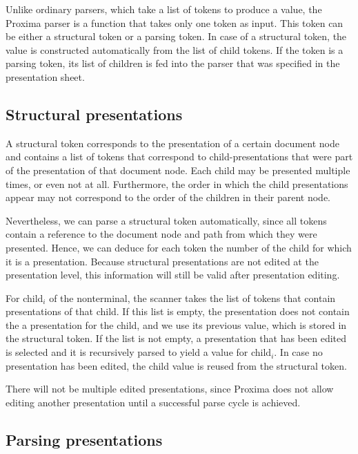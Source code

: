 \documentclass[12pt]{article}
\begin{document}
Unlike ordinary parsers, which take a list of tokens to produce a value, the Proxima parser is a function that takes only one token as input. This token can be either a structural token or a parsing token. In case of a structural token, the value is constructed automatically from the list of child tokens. If the token is a parsing token, its list of children is fed into the parser that was specified in the presentation sheet.

\subsection{Structural presentations}

A structural token corresponds to the presentation of a certain document node and contains a list of tokens that correspond to child-presentations that were part of the presentation of that document node. Each child may be presented multiple times, or even not at all. Furthermore, the order in which the child presentations appear may not correspond to the order of the children in their parent node.

Nevertheless, we can parse a structural token automatically, since all tokens contain a  reference to the document node and path from which they were presented. Hence, we can deduce for each token the number of the child for which it is a presentation. Because structural presentations are not edited at the presentation level, this information will still be valid after presentation editing. 

For child$_i$ of the nonterminal, the scanner takes the list of tokens that contain presentations of that child. If this list is empty, the presentation does not contain the a presentation for the child, and we use its previous value, which is stored in the structural token. If the list is not empty, a presentation that has been edited is selected and it is recursively parsed to yield a value for child$_i$. In case no presentation has been edited, the child value is reused from the structural token.

There will not be multiple edited presentations, since Proxima does not allow editing another presentation until a successful parse cycle is achieved.


\subsection{Parsing presentations}
\end{document}
